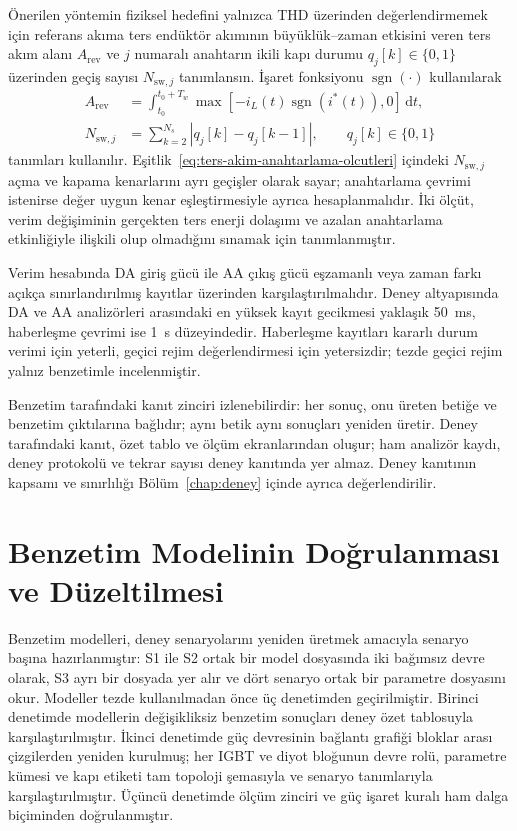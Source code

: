 Önerilen yöntemin fiziksel hedefini yalnızca THD üzerinden değerlendirmemek için referans akıma ters endüktör akımının büyüklük--zaman etkisini veren ters akım alanı $A_{\mathrm{rev}}$ ve $j$ numaralı anahtarın ikili kapı durumu $q_j[k]\in\{0,1\}$ üzerinden geçiş sayısı $N_{\mathrm{sw},j}$ tanımlansın. İşaret fonksiyonu $\operatorname{sgn}(\cdot)$ kullanılarak
\begin{equation}
  \begin{aligned}
    A_{\mathrm{rev}} &= \int_{t_0}^{t_0+T_w}\max\!\left[-i_L(t)\operatorname{sgn}\!\left(i^{\ast}(t)\right),0\right]\,\mathrm{d}t, \\
    N_{\mathrm{sw},j} &= \sum_{k=2}^{N_s}\left|q_j[k]-q_j[k-1]\right|,
    \qquad q_j[k]\in\{0,1\}
  \end{aligned}
  \label{eq:ters-akim-anahtarlama-olcutleri}
\end{equation}
tanımları kullanılır. Eşitlik~\eqref{eq:ters-akim-anahtarlama-olcutleri} içindeki $N_{\mathrm{sw},j}$ açma ve kapama kenarlarını ayrı geçişler olarak sayar; anahtarlama çevrimi istenirse değer uygun kenar eşleştirmesiyle ayrıca hesaplanmalıdır. İki ölçüt, verim değişiminin gerçekten ters enerji dolaşımı ve azalan anahtarlama etkinliğiyle ilişkili olup olmadığını sınamak için tanımlanmıştır.

Verim hesabında DA giriş gücü ile AA çıkış gücü eşzamanlı veya zaman farkı açıkça sınırlandırılmış kayıtlar üzerinden karşılaştırılmalıdır. Deney altyapısında DA ve AA analizörleri arasındaki en yüksek kayıt gecikmesi yaklaşık \SI{50}{\milli\second}, haberleşme çevrimi ise \SI{1}{\second} düzeyindedir. Haberleşme kayıtları kararlı durum verimi için yeterli, geçici rejim değerlendirmesi için yetersizdir; tezde geçici rejim yalnız benzetimle incelenmiştir.

Benzetim tarafındaki kanıt zinciri izlenebilirdir: her sonuç, onu üreten betiğe ve benzetim çıktılarına bağlıdır; aynı betik aynı sonuçları yeniden üretir. Deney tarafındaki kanıt, özet tablo ve ölçüm ekranlarından oluşur; ham analizör kaydı, deney protokolü ve tekrar sayısı deney kanıtında yer almaz. Deney kanıtının kapsamı ve sınırlılığı Bölüm~\ref{chap:deney} içinde ayrıca değerlendirilir.

\section{Benzetim Modelinin Doğrulanması ve Düzeltilmesi}
\label{sec:model-dogrulama-duzeltme}

Benzetim modelleri, deney senaryolarını yeniden üretmek amacıyla senaryo başına hazırlanmıştır: S1 ile S2 ortak bir model dosyasında iki bağımsız devre olarak, S3 ayrı bir dosyada yer alır ve dört senaryo ortak bir parametre dosyasını okur. Modeller tezde kullanılmadan önce üç denetimden geçirilmiştir. Birinci denetimde modellerin değişikliksiz benzetim sonuçları deney özet tablosuyla karşılaştırılmıştır. İkinci denetimde güç devresinin bağlantı grafiği bloklar arası çizgilerden yeniden kurulmuş; her IGBT ve diyot bloğunun devre rolü, parametre kümesi ve kapı etiketi tam topoloji şemasıyla ve senaryo tanımlarıyla karşılaştırılmıştır. Üçüncü denetimde ölçüm zinciri ve güç işaret kuralı ham dalga biçiminden doğrulanmıştır.

